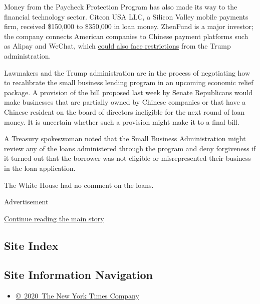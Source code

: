 Money from the Paycheck Protection Program has also made its way to the
financial technology sector. Citcon USA LLC, a Silicon Valley mobile
payments firm, received \$150,000 to \$350,000 in loan money. ZhenFund
is a major investor; the company connects American companies to Chinese
payment platforms such as Alipay and WeChat, which
\href{https://www.nytimes.com/2020/07/15/technology/tiktok-washington-lobbyist.html}{could
also face restrictions} from the Trump administration.

Lawmakers and the Trump administration are in the process of negotiating
how to recalibrate the small business lending program in an upcoming
economic relief package. A provision of the bill proposed last week by
Senate Republicans would make businesses that are partially owned by
Chinese companies or that have a Chinese resident on the board of
directors ineligible for the next round of loan money. It is uncertain
whether such a provision might make it to a final bill.

A Treasury spokeswoman noted that the Small Business Administration
might review any of the loans administered through the program and deny
forgiveness if it turned out that the borrower was not eligible or
misrepresented their business in the loan application.

The White House had no comment on the loans.

Advertisement

\protect\hyperlink{after-bottom}{Continue reading the main story}

\hypertarget{site-index}{%
\subsection{Site Index}\label{site-index}}

\hypertarget{site-information-navigation}{%
\subsection{Site Information
Navigation}\label{site-information-navigation}}

\begin{itemize}
\tightlist
\item
  \href{https://help.nytimes.com/hc/en-us/articles/115014792127-Copyright-notice}{©~2020~The
  New York Times Company}
\end{itemize}

